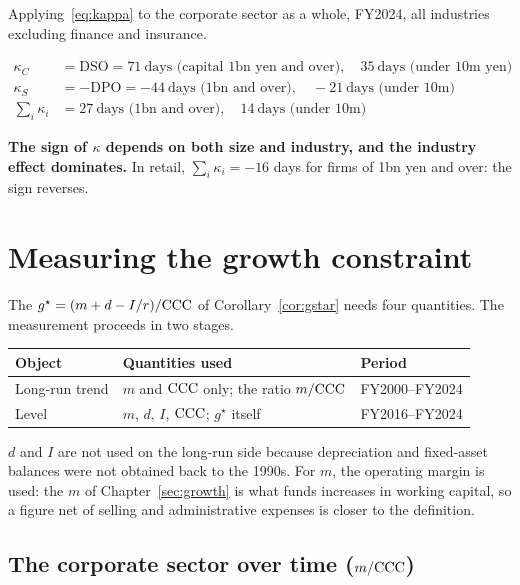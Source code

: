 Applying~\eqref{eq:kappa} to the corporate sector as a whole, FY2024, all industries
excluding finance and insurance.

\begin{align}
\kappa_C &= \mathrm{DSO} = 71\ \text{days (capital 1bn yen and over)},\quad 35\ \text{days (under 10m yen)}\\
\kappa_S &= -\mathrm{DPO} = -44\ \text{days (1bn and over)},\quad -21\ \text{days (under 10m)}\\
\sum_i \kappa_i &= 27\ \text{days (1bn and over)},\quad 14\ \text{days (under 10m)}
\end{align}

\textbf{The sign of $\kappa$ depends on both size and industry, and the industry effect
dominates.} In retail, $\sum_i\kappa_i = -16$ days for firms of 1bn yen and over: the sign
reverses.

\section{Measuring the growth constraint}
\label{sec:gstar-measured}

The $g^\star=(m+d-I/r)/\mathrm{CCC}$ of Corollary~\ref{cor:gstar} needs four quantities. The
measurement proceeds in two stages.

\begin{center}
\begin{tabularx}{\textwidth}{@{}lXl@{}}
\toprule
Object & Quantities used & Period \\
\midrule
Long-run trend & $m$ and $\mathrm{CCC}$ only; the ratio $m/\mathrm{CCC}$ & FY2000--FY2024 \\
Level & $m$, $d$, $I$, $\mathrm{CCC}$; $g^\star$ itself & FY2016--FY2024 \\
\bottomrule
\end{tabularx}
\label{tab:gstar-measurement-stages}
\end{center}

$d$ and $I$ are not used on the long-run side because depreciation and fixed-asset balances
were not obtained back to the 1990s. For $m$, the operating margin is used: the $m$ of
Chapter~\ref{sec:growth} is what funds increases in working capital, so a figure net of
selling and administrative expenses is closer to the definition.

\subsection{The corporate sector over time ($m/\mathrm{CCC}$)}

